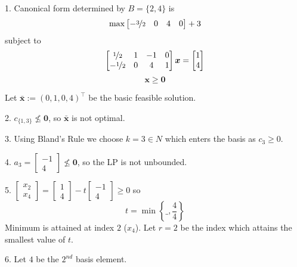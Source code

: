 \begin{exbox}
\begin{example}
        1. Canonical form determined by $ B=\{2,4\} $ is
        \[ \max
            \begin{bmatrix}
                -\nicefrac{3}{2} & 0 & 4 & 0
            \end{bmatrix} + 3\]
        subject to
        \[
            \begin{bmatrix}
                \nicefrac{1}{2}  & 1 & -1 & 0 \\
                -\nicefrac{1}{2} & 0 & 4  & 1
            \end{bmatrix}\bm{x}=
            \begin{bmatrix}
                1 \\
                4
            \end{bmatrix}
        \]
        \[ \bm{x}\geqslant  \bm{0} \]

        Let $ \bm{\bar{x}}:=(0,1,0,4)^\top $ be the basic feasible solution.

        2. $ c_{\{1,3\}} \nleq \bm{0} $, so $ \bm{\bar{x}} $ is not optimal.

        3. Using Bland's Rule we choose $ k=3\in N $ which enters the basis
        as $ c_3\geqslant  0 $.

        4.
        $
            a_3= \begin{bmatrix}
                -1 \\
                4
            \end{bmatrix}\nleq \bm{0}
        $,
        so the LP is not unbounded.

        5.
        $
            \begin{bmatrix}
                x_2 \\
                x_4
            \end{bmatrix}
            =
            \begin{bmatrix}
                1 \\
                4
            \end{bmatrix}-t
            \begin{bmatrix}
                -1 \\
                4
            \end{bmatrix}\geqslant  0
        $
        so
        \[ t=\min \left\{\_,\frac{4}{4} \right\} \]
        Minimum is attained at index $ 2 $ ($ x_4 $). Let $ r=2 $ be the index which attains the smallest value of $ t $.

        6. Let $ 4 $ be the $ 2^{nd} $ basis element.


\end{example}
\end{exbox}
